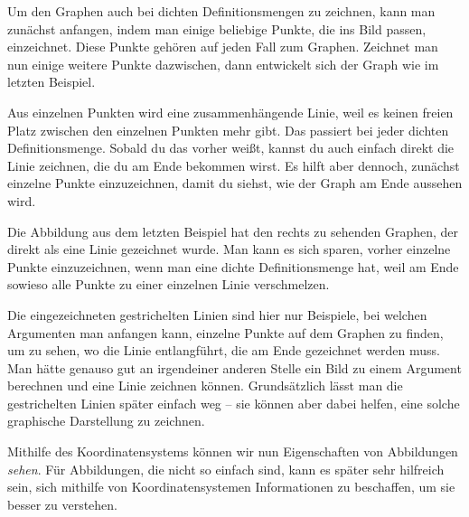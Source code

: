 \documentclass[../../main.tex]{subfiles}
\begin{document}
Um den Graphen auch bei dichten Definitionsmengen zu zeichnen, kann man zunächst anfangen, indem man einige beliebige Punkte, die ins Bild passen, einzeichnet. Diese Punkte gehören auf jeden Fall zum Graphen. Zeichnet man nun einige weitere Punkte dazwischen, dann entwickelt sich der Graph wie im letzten Beispiel.

Aus einzelnen Punkten wird eine zusammenhängende Linie, weil es keinen freien Platz zwischen den einzelnen Punkten mehr gibt. Das passiert bei jeder dichten Definitionsmenge. Sobald du das vorher weißt, kannst du auch einfach direkt die Linie zeichnen, die du am Ende bekommen wirst. Es hilft aber dennoch, zunächst einzelne Punkte einzuzeichnen, damit du siehst, wie der Graph am Ende aussehen wird.

\begin{example}
    
    Die Abbildung aus dem letzten Beispiel hat den rechts zu sehenden Graphen, der direkt als eine Linie gezeichnet wurde. Man kann es sich sparen, vorher einzelne Punkte einzuzeichnen, wenn man eine dichte Definitionsmenge hat, weil am Ende sowieso alle Punkte zu einer einzelnen Linie verschmelzen.
    
    Die eingezeichneten gestrichelten Linien sind hier nur Beispiele, bei welchen Argumenten man anfangen kann, einzelne Punkte auf dem Graphen zu finden, um zu sehen, wo die Linie entlangführt, die am Ende gezeichnet werden muss. Man hätte genauso gut an irgendeiner anderen Stelle ein Bild zu einem Argument berechnen und eine Linie zeichnen können. Grundsätzlich lässt man die gestrichelten Linien später einfach weg -- sie können aber dabei helfen, eine solche graphische Darstellung zu zeichnen.
\end{example}

Mithilfe des Koordinatensystems können wir nun Eigenschaften von Abbildungen \emph{sehen}. Für Abbildungen, die nicht so einfach sind, kann es später sehr hilfreich sein, sich mithilfe von Koordinatensystemen Informationen zu beschaffen, um sie besser zu verstehen.
\end{document}
